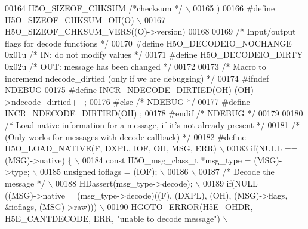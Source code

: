 \begin{DoxyCode}
00164 \textcolor{preprocessor}{            H5O\_SIZEOF\_CHKSUM       }\textcolor{comment}{/*checksum */}\textcolor{preprocessor}{                 \(\backslash\)}
00165 \textcolor{preprocessor}{    )}
00166 \textcolor{preprocessor}{#define H5O\_SIZEOF\_CHKSUM\_OH(O)                           \(\backslash\)}
00167 \textcolor{preprocessor}{    H5O\_SIZEOF\_CHKSUM\_VERS((O)->version)}
00168 
00169 \textcolor{comment}{/* Input/output flags for decode functions */}
00170 \textcolor{preprocessor}{#define H5O\_DECODEIO\_NOCHANGE           0x01u   }\textcolor{comment}{/* IN: do not modify values */}\textcolor{preprocessor}{}
00171 \textcolor{preprocessor}{#define H5O\_DECODEIO\_DIRTY              0x02u   }\textcolor{comment}{/* OUT: message has been changed */}\textcolor{preprocessor}{}
00172 
00173 \textcolor{comment}{/* Macro to incremend ndecode\_dirtied (only if we are debugging) */}
00174 \textcolor{preprocessor}{#ifndef NDEBUG}
00175 \textcolor{preprocessor}{#define INCR\_NDECODE\_DIRTIED(OH) (OH)->ndecode\_dirtied++;}
00176 \textcolor{preprocessor}{#else }\textcolor{comment}{/* NDEBUG */}\textcolor{preprocessor}{}
00177 \textcolor{preprocessor}{#define INCR\_NDECODE\_DIRTIED(OH) ;}
00178 \textcolor{preprocessor}{#endif }\textcolor{comment}{/* NDEBUG */}\textcolor{preprocessor}{}
00179 
00180 \textcolor{comment}{/* Load native information for a message, if it's not already present */}
00181 \textcolor{comment}{/* (Only works for messages with decode callback) */}
00182 \textcolor{preprocessor}{#define H5O\_LOAD\_NATIVE(F, DXPL, IOF, OH, MSG, ERR)                           \(\backslash\)}
00183 \textcolor{preprocessor}{    if(NULL == (MSG)->native) \{                                               \(\backslash\)}
00184 \textcolor{preprocessor}{        const H5O\_msg\_class\_t   *msg\_type = (MSG)->type;                      \(\backslash\)}
00185 \textcolor{preprocessor}{        unsigned                ioflags = (IOF);                              \(\backslash\)}
00186 \textcolor{preprocessor}{                                                                              \(\backslash\)}
00187 \textcolor{preprocessor}{        }\textcolor{comment}{/* Decode the message */}\textcolor{preprocessor}{                                              \(\backslash\)}
00188 \textcolor{preprocessor}{        HDassert(msg\_type->decode);                                           \(\backslash\)}
00189 \textcolor{preprocessor}{        if(NULL == ((MSG)->native = (msg\_type->decode)((F), (DXPL), (OH), (MSG)->flags, &ioflags,
       (MSG)->raw))) \(\backslash\)}
00190 \textcolor{preprocessor}{            HGOTO\_ERROR(H5E\_OHDR, H5E\_CANTDECODE, ERR, "unable to decode message") \(\backslash\)}

\end{DoxyCode}
